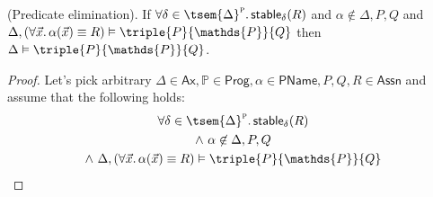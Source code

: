 \begin{lem}
	\label{lem:pred-e}
	(Predicate elimination).
	If $\forall \delta \in \tsem{\Delta}^\textsc{p} \ldotp \mathsf{stable}_\delta(R)$ and $\alpha \not\in \Delta, P, Q$ and $\Delta, (\forall \vec{x} \ldotp \alpha(\vec{x}) \equiv R) \vDash \triple{P}{\mathds{P}}{Q}$ then $\Delta \vDash \triple{P}{\mathds{P}}{Q}$.
	\begin{proof}
		Let's pick arbitrary $\Delta \in \mathsf{Ax}, \mathds{P} \in \mathsf{Prog}, \alpha \in \mathsf{PName}, P, Q, R \in \mathsf{Assn}$ and assume that the following holds:
		\begin{gather}
			\forall \delta \in \tsem{\Delta}^\textsc{p} \ldotp \mathsf{stable}_\delta(R) \\
			\land\ \alpha \not\in \Delta, P, Q \\
			\land\ \Delta, (\forall \vec{x} \ldotp \alpha(\vec{x}) \equiv R) \vDash \triple{P}{\mathds{P}}{Q}
		\end{gather}
	\end{proof}
\end{lem}
